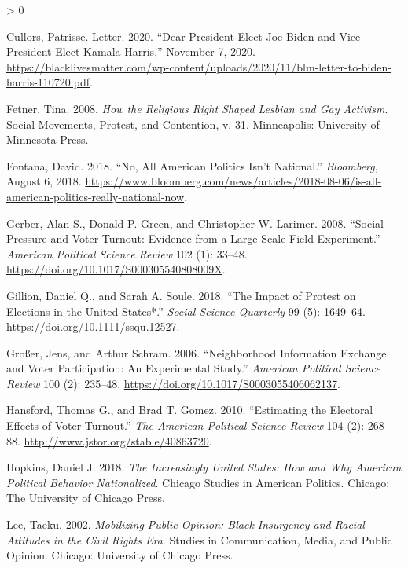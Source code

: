 \documentclass[
  12pt,
]{article}
\newlength{\cslhangindent}
\newenvironment{CSLReferences}[2] %
 {%
  \setlength{\parindent}{0pt}
  \ifodd #1 \everypar{\setlength{\hangindent}{\cslhangindent}}\ignorespaces\fi
  \ifnum #2 > 0
  \setlength{\parskip}{#2\baselineskip}
  \fi
 }%
 {}
\begin{document}
\begin{CSLReferences}{1}{0}
\leavevmode\hypertarget{ref-Cullors2020}{}%
Cullors, Patrisse. Letter. 2020. {``Dear {President}-{Elect Joe Biden} and {Vice}-{President}-{Elect Kamala Harris},''} November 7, 2020. \url{https://blacklivesmatter.com/wp-content/uploads/2020/11/blm-letter-to-biden-harris-110720.pdf}.

\leavevmode\hypertarget{ref-Fetner2008}{}%
Fetner, Tina. 2008. \emph{How the Religious Right Shaped Lesbian and Gay Activism}. Social Movements, Protest, and Contention, v. 31. {Minneapolis}: {University of Minnesota Press}.

\leavevmode\hypertarget{ref-Fontana2018}{}%
Fontana, David. 2018. {``No, {All American Politics Isn}'t {National}.''} \emph{Bloomberg}, August 6, 2018. \url{https://www.bloomberg.com/news/articles/2018-08-06/is-all-american-politics-really-national-now}.

\leavevmode\hypertarget{ref-Gerber2008}{}%
Gerber, Alan S., Donald P. Green, and Christopher W. Larimer. 2008. {``Social {Pressure} and {Voter Turnout}: {Evidence} from a {Large}-{Scale Field Experiment}.''} \emph{American Political Science Review} 102 (1): 33--48. \url{https://doi.org/10.1017/S000305540808009X}.

\leavevmode\hypertarget{ref-Gillion2018}{}%
Gillion, Daniel Q., and Sarah A. Soule. 2018. {``The {Impact} of {Protest} on {Elections} in the {United States}*.''} \emph{Social Science Quarterly} 99 (5): 1649--64. \url{https://doi.org/10.1111/ssqu.12527}.

\leavevmode\hypertarget{ref-Grosser2006}{}%
Großer, Jens, and Arthur Schram. 2006. {``Neighborhood {Information Exchange} and {Voter Participation}: {An Experimental Study}.''} \emph{American Political Science Review} 100 (2): 235--48. \url{https://doi.org/10.1017/S0003055406062137}.

\leavevmode\hypertarget{ref-Hansford2010}{}%
Hansford, Thomas G., and Brad T. Gomez. 2010. {``Estimating the {Electoral Effects} of {Voter Turnout}.''} \emph{The American Political Science Review} 104 (2): 268--88. \url{http://www.jstor.org/stable/40863720}.

\leavevmode\hypertarget{ref-Hopkins2018}{}%
Hopkins, Daniel J. 2018. \emph{The Increasingly {United States}: How and Why {American} Political Behavior Nationalized}. Chicago Studies in {American} Politics. {Chicago}: {The University of Chicago Press}.

\leavevmode\hypertarget{ref-Lee2002}{}%
Lee, Taeku. 2002. \emph{Mobilizing Public Opinion: {Black} Insurgency and Racial Attitudes in the Civil Rights Era}. Studies in Communication, Media, and Public Opinion. {Chicago}: {University of Chicago Press}.


\end{CSLReferences}
\end{document}
